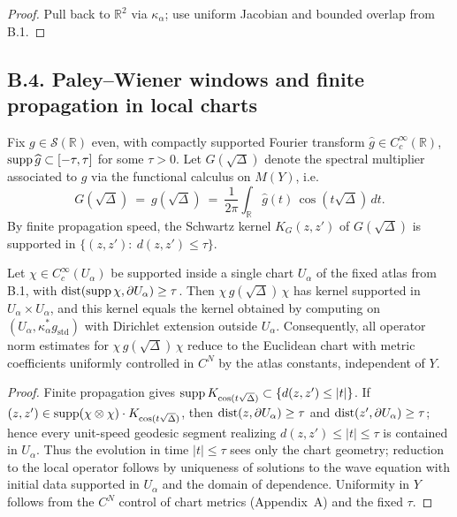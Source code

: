 \begin{proof}
Pull back to $\mathbb R^2$ via $\kappa_\alpha$; use uniform Jacobian and bounded overlap from B.1.
\end{proof}

\subsection*{B.4. Paley–Wiener windows and finite propagation in local charts}

\noindent
Fix $g\in\mathcal S(\mathbb R)$ even, with compactly supported Fourier transform
$\widehat g\in C_c^\infty(\mathbb R)$, $\operatorname{supp}\widehat g\subset[-\tau,\tau]$ for some $\tau>0$.
Let $G(\sqrt\Delta)$ denote the spectral multiplier associated to $g$ via the functional
calculus on $M(Y)$, i.e.
\[
G(\sqrt\Delta)\ =\ g(\sqrt\Delta)\ =\ \frac{1}{2\pi}\int_{\mathbb R} \widehat g(t)\,\cos(t\sqrt\Delta)\,dt.
\]
By finite propagation speed, the Schwartz kernel $K_G(z,z')$ of $G(\sqrt\Delta)$ is supported in
$\{(z,z'):\ d(z,z')\le \tau\}$.

\begin{lemma}\label{lem:B.4-localcut}
Let $\chi\in C_c^\infty(U_\alpha)$ be supported inside a single chart $U_\alpha$ of the fixed
atlas from B.1, with $\operatorname{dist}(\operatorname{supp}\chi,\partial U_\alpha)\ge \tau$. Then
$\chi\,g(\sqrt\Delta)\,\chi$ has kernel supported in $U_\alpha\times U_\alpha$, and this kernel
equals the kernel obtained by computing on $(U_\alpha,\kappa_\alpha^*g_{\mathrm{std}})$ with
Dirichlet extension outside $U_\alpha$. Consequently, all operator norm estimates for
$\chi\,g(\sqrt\Delta)\,\chi$ reduce to the Euclidean chart with metric coefficients uniformly
controlled in $C^{N}$ by the atlas constants, independent of $Y$.
\end{lemma}

\begin{proof}
Finite propagation gives $\operatorname{supp} K_{\cos(t\sqrt\Delta)}\subset\{d(z,z')\le |t|\}$.
If $(z,z')\in\operatorname{supp}(\chi\otimes\chi)\cdot K_{\cos(t\sqrt\Delta)}$, then $\operatorname{dist}(z,\partial U_\alpha)\ge\tau$
and $\operatorname{dist}(z',\partial U_\alpha)\ge\tau$; hence every unit-speed geodesic segment realizing $d(z,z')\le |t|\le \tau$ is contained in $U_\alpha$. Thus the evolution in time $|t|\le\tau$ sees only the chart geometry; reduction to the local operator follows by uniqueness of solutions to the wave equation with initial data supported in $U_\alpha$ and the domain of dependence. Uniformity in $Y$ follows from the $C^N$ control of chart metrics (Appendix~A) and the fixed $\tau$.
\end{proof}

